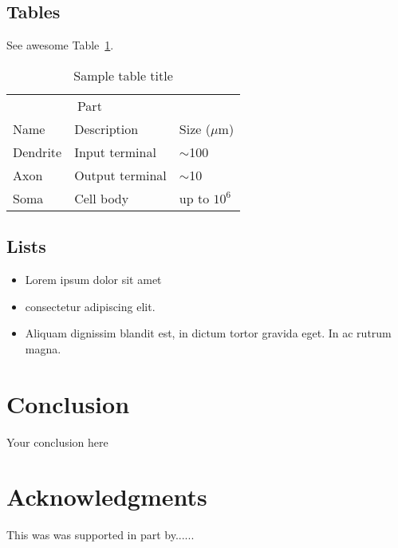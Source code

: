 \documentclass{article}
\begin{document}
\subsection{Tables}
\lipsum[12]
See awesome Table~\ref{tab:table}.

\begin{table}
 \caption{Sample table title}
  \centering
  \begin{tabular}{lll}
    \toprule
    \multicolumn{2}{c}{Part}                   \\
    \cmidrule(r){1-2}
    Name     & Description     & Size ($\mu$m) \\
    \midrule
    Dendrite & Input terminal  & $\sim$100     \\
    Axon     & Output terminal & $\sim$10      \\
    Soma     & Cell body       & up to $10^6$  \\
    \bottomrule
  \end{tabular}
  \label{tab:table}
\end{table}

\subsection{Lists}
\begin{itemize}
\item Lorem ipsum dolor sit amet
\item consectetur adipiscing elit. 
\item Aliquam dignissim blandit est, in dictum tortor gravida eget. In ac rutrum magna.
\end{itemize}


\section{Conclusion}
Your conclusion here

\section*{Acknowledgments}
This was was supported in part by......

  
\end{document}
